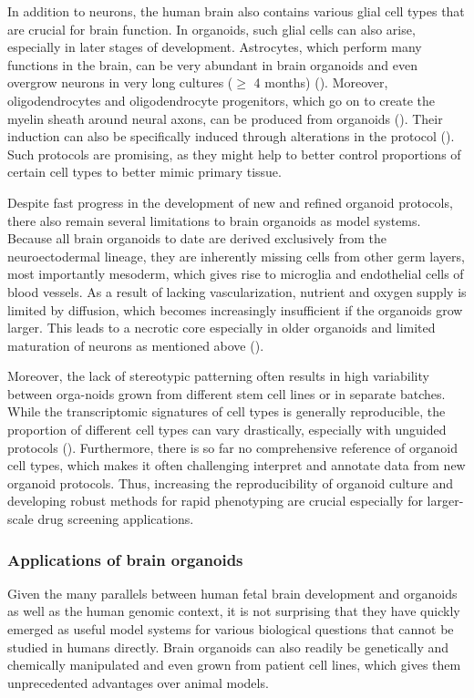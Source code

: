 In addition to neurons, the human brain also contains various glial cell types that are crucial for brain function. In organoids, such glial cells can also arise, especially in later stages of development. Astrocytes, which perform many functions in the brain, can be very abundant in brain organoids and even overgrow neurons in very long cultures ($\geq$ 4 months) (\cite{kanton_organoid_2019,giandomenico_cerebral_2019,sloan_human_2017}). Moreover, oligodendrocytes and oligodendrocyte progenitors, which go on to create the myelin sheath around neural axons, can be produced from organoids (\cite{tanaka_synthetic_2020}). Their induction can also be specifically induced through alterations in the protocol (\cite{madhavan_induction_2018,marton_differentiation_2019}). Such protocols are promising, as they might help to better control proportions of certain cell types to better mimic primary tissue.

Despite fast progress in the development of new and refined organoid protocols, there also remain several limitations to brain organoids as model systems. Because all brain organoids to date are derived exclusively from the neuroectodermal lineage, they are inherently missing cells from other germ layers, most importantly mesoderm, which gives rise to microglia and endothelial cells of blood vessels. As a result of lacking vascularization, nutrient and oxygen supply is limited by diffusion, which becomes increasingly insufficient if the organoids grow larger. This leads to a necrotic core especially in older organoids and limited maturation of neurons as mentioned above (\cite{vertesy_cellular_2022,bhaduri_cell_2020}). 

Moreover, the lack of stereotypic patterning often results in high variability between orga-noids grown from different stem cell lines or in separate batches. While the transcriptomic signatures of cell types is generally reproducible, the proportion of different cell types can vary drastically, especially with unguided protocols (\cite{kanton_organoid_2019}). Furthermore, there is so far no comprehensive reference of organoid cell types, which makes it often challenging interpret and annotate data from new organoid protocols. Thus, increasing the reproducibility of organoid culture and developing robust methods for rapid phenotyping are crucial especially for larger-scale drug screening applications. 



\subsubsection{Applications of brain organoids}
Given the many parallels between human fetal brain development and organoids as well as the human genomic context, it is not surprising that they have quickly emerged as useful model systems for various biological questions that cannot be studied in humans directly. Brain organoids can also readily be genetically and chemically manipulated and even grown from patient cell lines, which gives them unprecedented advantages over animal models. 

